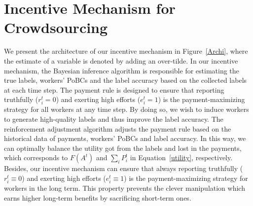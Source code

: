 \documentclass{article}
\begin{document}
\section{Incentive Mechanism for Crowdsourcing}
We present the architecture of our incentive mechanism in Figure~\ref{Archi}, where the estimate of a variable is denoted by adding an over-tilde.
In our incentive mechanism, the Bayesian inference algorithm is responsible for estimating the true labels, workers' PoBCs and the label accuracy based on the collected labels at each time step.
The payment rule is designed to ensure that reporting truthfully ($r^{t}_i = 0$) and exerting high efforts ($e^{t}_i=1$) is the payment-maximizing strategy for all workers at any time step.
By doing so, we wish to induce workers to generate high-quality labels and thus improve the label accuracy.
The reinforcement adjustment algorithm adjusts the payment rule based on the historical data of payments, workers' PoBCs and label accuracy.
In this way, we can optimally balance the utility got from the labels and lost in the payments, which corresponds to $F(A^t)$ and $\sum_{i}P_i^t$ in Equation~\ref{utility}, respectively.
Besides, our incentive mechanism can ensure that always reporting truthfully ($r^{t}_i \equiv 0$) and exerting high efforts ($e^{t}_i \equiv 1$) is the payment-maximizing strategy for workers in the long term.
This property prevents the clever manipulation which earns higher long-term benefits by sacrificing short-term ones.
\end{document}

